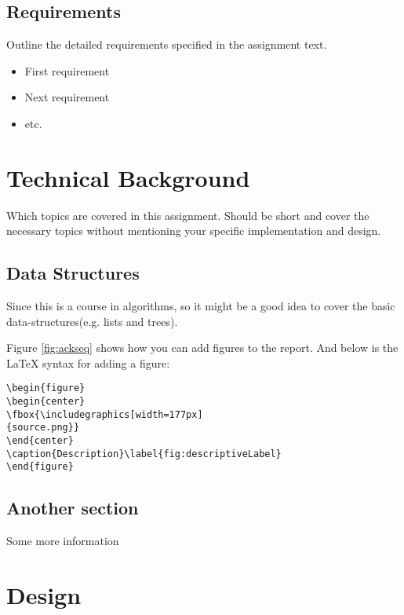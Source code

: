 \subsection{Requirements}

Outline the detailed requirements specified in the assignment text.

\begin{itemize}

\item First requirement
\item Next requirement
\item etc.

\end{itemize}


\section{Technical Background}

Which topics are covered in this assignment. Should be short and cover the necessary topics without mentioning your specific implementation and design.

\subsection{Data Structures}

Since this is a course in algorithms, so it might be a good idea to cover the basic data-structures(e.g. lists and trees). 

Figure \ref{fig:ackseq} shows how you can add figures to the report. And below is the LaTeX syntax for adding a figure:

\begin{verbatim}
\begin{figure}
\begin{center}
\fbox{\includegraphics[width=177px]
{source.png}}
\end{center}
\caption{Description}\label{fig:descriptiveLabel}
\end{figure}
\end{verbatim}

\subsection{Another section}

Some more information

\section{Design}

